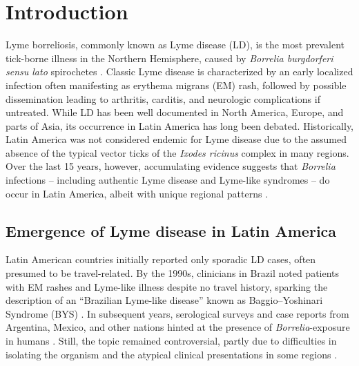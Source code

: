 \documentclass[11pt,letterpaper]{article}
\begin{document}
\doublespacing

\section{Introduction}
Lyme borreliosis, commonly known as Lyme disease (LD), is the most prevalent tick-borne illness in the Northern Hemisphere, caused by \textit{Borrelia burgdorferi sensu lato} spirochetes \citep{Binetruy2020}. Classic Lyme disease is characterized by an early localized infection often manifesting as erythema migrans (EM) rash, followed by possible dissemination leading to arthritis, carditis, and neurologic complications if untreated. While LD has been well documented in North America, Europe, and parts of Asia, its occurrence in Latin America has long been debated. Historically, Latin America was not considered endemic for Lyme disease due to the assumed absence of the typical vector ticks of the \textit{Ixodes ricinus} complex in many regions. Over the last 15 years, however, accumulating evidence suggests that \textit{Borrelia} infections – including authentic Lyme disease and Lyme-like syndromes – do occur in Latin America, albeit with unique regional patterns \citep{Lucca2024, Lucca2024a}.

\subsection{Emergence of Lyme disease in Latin America}
Latin American countries initially reported only sporadic LD cases, often presumed to be travel-related. By the 1990s, clinicians in Brazil noted patients with EM rashes and Lyme-like illness despite no travel history, sparking the description of an “Brazilian Lyme-like disease” known as Baggio–Yoshinari Syndrome (BYS) \citep{Yoshinari2022, Yoshinari2022a}. In subsequent years, serological surveys and case reports from Argentina, Mexico, and other nations hinted at the presence of \textit{Borrelia}-exposure in humans \citep{Lucca2024, Colunga-Salas2020}. Still, the topic remained controversial, partly due to difficulties in isolating the organism and the atypical clinical presentations in some regions \citep{Yoshinari2022b, Yoshinari2022c}.
\end{document}
